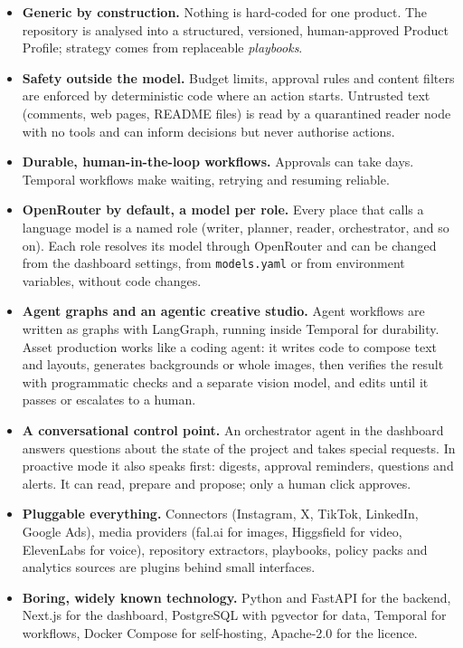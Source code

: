 \documentclass[11pt,a4paper]{article}
\begin{document}
\begin{itemize}
  \item \textbf{Generic by construction.} Nothing is hard-coded for one product. The repository is analysed into a structured, versioned, human-approved Product Profile; strategy comes from replaceable \emph{playbooks}.
  \item \textbf{Safety outside the model.} Budget limits, approval rules and content filters are enforced by deterministic code where an action starts. Untrusted text (comments, web pages, README files) is read by a quarantined reader node with no tools and can inform decisions but never authorise actions.
  \item \textbf{Durable, human-in-the-loop workflows.} Approvals can take days. Temporal workflows make waiting, retrying and resuming reliable.
  \item \textbf{OpenRouter by default, a model per role.} Every place that calls a language model is a named role (writer, planner, reader, orchestrator, and so on). Each role resolves its model through OpenRouter and can be changed from the dashboard settings, from \texttt{models.yaml} or from environment variables, without code changes.
  \item \textbf{Agent graphs and an agentic creative studio.} Agent workflows are written as graphs with LangGraph, running inside Temporal for durability. Asset production works like a coding agent: it writes code to compose text and layouts, generates backgrounds or whole images, then verifies the result with programmatic checks and a separate vision model, and edits until it passes or escalates to a human.
  \item \textbf{A conversational control point.} An orchestrator agent in the dashboard answers questions about the state of the project and takes special requests. In proactive mode it also speaks first: digests, approval reminders, questions and alerts. It can read, prepare and propose; only a human click approves.
  \item \textbf{Pluggable everything.} Connectors (Instagram, X, TikTok, LinkedIn, Google Ads), media providers (fal.ai for images, Higgsfield for video, ElevenLabs for voice), repository extractors, playbooks, policy packs and analytics sources are plugins behind small interfaces.
  \item \textbf{Boring, widely known technology.} Python and FastAPI for the backend, Next.js for the dashboard, PostgreSQL with pgvector for data, Temporal for workflows, Docker Compose for self-hosting, Apache-2.0 for the licence.
\end{itemize}
\end{document}
